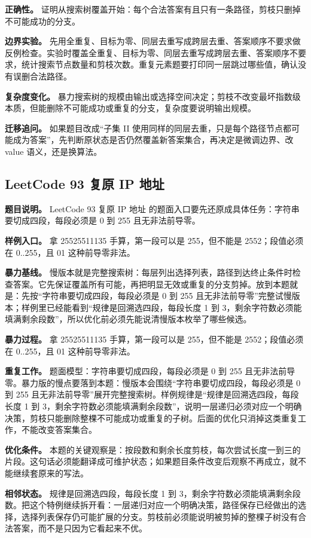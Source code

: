 \textbf{正确性。} 证明从搜索树覆盖开始：每个合法答案有且只有一条路径，剪枝只删掉不可能成功的分支。

\textbf{边界实验。} 先用全重复、目标为零、同层去重写成跨层去重、答案顺序不要求做反例检查。实验时覆盖全重复、目标为零、同层去重写成跨层去重、答案顺序不要求，统计搜索节点数量和剪枝次数。重复元素题要打印同一层跳过哪些值，确认没有误删合法路径。

\textbf{复杂度变化。} 暴力搜索树的规模由输出或选择空间决定；剪枝不改变最坏指数级本质，但能删除不可能成功或重复的分支，复杂度要说明输出规模。

\textbf{迁移追问。} 如果题目改成“子集 II 使用同样的同层去重，只是每个路径节点都可能成为答案”，先判断原状态是否仍然覆盖新答案集合，再决定是微调边界、改 value 语义，还是换算法。

\subsection{LeetCode 93 复原 IP 地址}

\textbf{题目说明。} LeetCode 93 复原 IP 地址 的题面入口要先还原成具体任务：字符串要切成四段，每段必须是 0 到 255 且无非法前导零。

\textbf{样例入口。} 拿 25525511135 手算，第一段可以是 255，但不能是 2552；段值必须在 0..255，且 01 这种前导零非法。

\textbf{暴力基线。} 慢版本就是完整搜索树：每层列出选择列表，路径到达终止条件时检查答案。它先保证覆盖所有可能，再把明显无效或重复的分支剪掉。放到本题就是：先按“字符串要切成四段，每段必须是 0 到 255 且无非法前导零”完整试慢版本；样例里已经能看到“规律是回溯选四段，每段长度 1 到 3，剩余字符数必须能填满剩余段数”，所以优化前必须先能说清慢版本枚举了哪些候选。

\textbf{暴力过程。} 拿 25525511135 手算，第一段可以是 255，但不能是 2552；段值必须在 0..255，且 01 这种前导零非法。

\textbf{重复工作。} 题面模型：字符串要切成四段，每段必须是 0 到 255 且无非法前导零。暴力版的慢点要落到本题：慢版本会围绕“字符串要切成四段，每段必须是 0 到 255 且无非法前导零”展开完整搜索树。样例规律是“规律是回溯选四段，每段长度 1 到 3，剩余字符数必须能填满剩余段数”，说明一层递归必须对应一个明确决策，剪枝只能删除整棵不可能成功或重复的子树。后面的优化只消掉这类重复工作，不能改变答案集合。

\textbf{优化条件。} 本题的关键观察是：按段数和剩余长度剪枝，每次尝试长度一到三的片段。这句话必须能翻译成可维护状态；如果题目条件改变后观察不再成立，就不能继续套原来的写法。

\textbf{相邻状态。} 规律是回溯选四段，每段长度 1 到 3，剩余字符数必须能填满剩余段数。把这个特例继续拆开看：一层递归对应一个明确决策，路径保存已经做出的选择，选择列表保存仍可能扩展的分支。剪枝前必须能说明被剪掉的整棵子树没有合法答案，而不是只因为它看起来不优。

